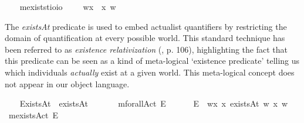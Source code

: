 \begin{isabellebody}
\ \ \isamarkupfalse%
\ mexists{\isacharcolon}{\isacharcolon}{\isachardoublequoteopen}{\isacharparenleft}{\isacharprime}t{\isasymRightarrow}io{\isacharparenright}{\isasymRightarrow}io{\isachardoublequoteclose}\ {\isacharparenleft}{\isachardoublequoteopen}\isactrlbold {\isasymexists}{\isachardoublequoteclose}{\isacharparenright}\ \ {\isachardoublequoteopen}\isactrlbold {\isasymexists}{\isasymPhi}\ {\isasymequiv}\ {\isasymlambda}w{\isachardot}{\isasymexists}x{\isachardot}\ {\isacharparenleft}{\isasymPhi}\ x\ w{\isacharparenright}{\isachardoublequoteclose}%
\begin{isamarkuptext}%
The \emph{existsAt} predicate is used to embed actualist quantifiers by restricting the domain of quantification at every possible world.
This standard technique has been referred to as \emph{existence relativization} (\cite{fitting98}, p. 106),
highlighting the fact that this predicate can be seen as a kind of meta-logical `existence predicate' telling us
which individuals \emph{actually} exist at a given world. This meta-logical concept does not appear in our object language.%
\end{isamarkuptext}\isamarkuptrue%
\ \ \isamarkupfalse%
\ ExistsAt{\isacharcolon}{\isacharcolon}{\isachardoublequoteopen}{\isasymup}{\isasymlangle}{\isasymzero}{\isasymrangle}{\isachardoublequoteclose}\ {\isacharparenleft}\ {\isachardoublequoteopen}existsAt{\isachardoublequoteclose}\ {}{}{\isacharparenright}\ \ \isanewline
\isanewline
\ \ \isamarkupfalse%
\ mforallAct{\isacharcolon}{\isacharcolon}{\isachardoublequoteopen}{\isasymup}{\isasymlangle}{\isasymup}{\isasymlangle}{\isasymzero}{\isasymrangle}{\isasymrangle}{\isachardoublequoteclose}\ {\isacharparenleft}{\isachardoublequoteopen}\isactrlbold {\isasymforall}\isactrlsup E{\isachardoublequoteclose}{\isacharparenright}\ %
\isanewline
\ \ \ \ \ {\isachardoublequoteopen}\isactrlbold {\isasymforall}\isactrlsup E{\isasymPhi}\ {\isasymequiv}\ {\isasymlambda}w{\isachardot}{\isasymforall}x{\isachardot}\ {\isacharparenleft}x\ existsAt\ w{\isacharparenright}{\isasymlongrightarrow}{\isacharparenleft}{\isasymPhi}\ x\ w{\isacharparenright}{\isachardoublequoteclose}\isanewline
\ \ \isamarkupfalse%
\ mexistsAct{\isacharcolon}{\isacharcolon}{\isachardoublequoteopen}{\isasymup}{\isasymlangle}{\isasymup}{\isasymlangle}{\isasymzero}{\isasymrangle}{\isasymrangle}{\isachardoublequoteclose}\ {\isacharparenleft}{\isachardoublequoteopen}\isactrlbold {\isasymexists}\isactrlsup E{\isachardoublequoteclose}{\isacharparenright}\isanewline

\end{isabellebody}
